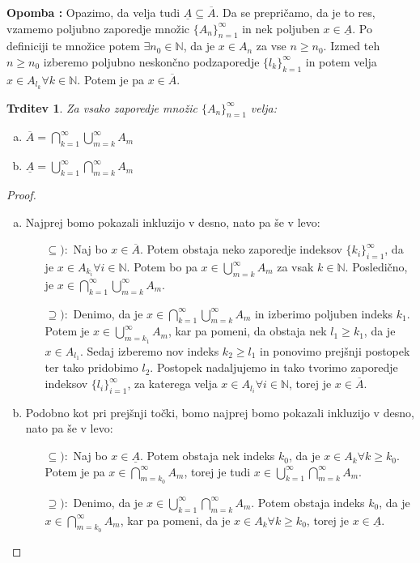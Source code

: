 \documentclass[a4paper, 10pt]{article}
\newtheorem{trditev}{Trditev}
\newcounter{opombe}
\newenvironment{opomba}{\begin{flushleft}\stepcounter{opombe}\textbf{Opomba \arabic{opombe}:}}{\hfill\end{flushleft}}
\newcommand{\mth}[1]{\ensuremath{\mathbb{#1}}}
\newcommand{\N}{\mth{N}}
\begin{document}
		\begin{opomba}
			Opazimo, da velja tudi $\underline{A} \subseteq \overline{A}$. Da se prepričamo, da je to res, vzamemo poljubno zaporedje množic $\{A_n\}_{n = 1}^\infty$ in nek poljuben $x\in \underline{A}$. Po definiciji te množice potem $\exists n_0\in\N$, da je $x\in A_n$ za vse $n\geq n_0$. Izmed teh $n\geq n_0$ izberemo poljubno neskončno podzaporedje $\{l_k\}_{k = 1}^\infty$ in potem velja $x\in A_{l_k} \forall k\in \N$. Potem je pa $x\in \overline{A}$.
		\end{opomba}
		\begin{trditev}
			\label{trd:karlimmn}
			Za vsako zaporedje množic $\{A_n\}_{n = 1}^\infty$ velja: \begin{enumerate}[a)]
				\item $\overline{A} = \bigcap_{k = 1}^\infty \bigcup_{m = k}^\infty A_m$
				\item $\underline{A} = \bigcup_{k = 1}^\infty \bigcap_{m = k}^\infty A_m$
			\end{enumerate}
		\end{trditev}
		\begin{proof}
			\begin{enumerate}[a)]
				\item Najprej bomo pokazali inkluzijo v desno, nato pa še v levo: \begin{itemize}
					\item[$\subseteq):$] Naj bo $x\in \overline{A}$. Potem obstaja neko zaporedje indeksov $\{k_i\}_{i = 1}^\infty$, da je $x\in A_{k_i} \forall i\in\N$. Potem bo pa $x\in \bigcup_{m = k}^\infty A_m$ za vsak $k\in\N$. Posledično, je $x\in \bigcap_{k = 1}^\infty \bigcup_{m = k}^\infty A_m$.
					\item[$\supseteq):$] Denimo, da je $x\in \bigcap_{k = 1}^\infty \bigcup_{m = k}^\infty A_m$ in izberimo poljuben indeks $k_1$. Potem je $x\in \bigcup_{m = k_1}^\infty A_m$, kar pa pomeni, da obstaja nek $l_1 \geq k_1$, da je $x\in A_{l_1}$. Sedaj izberemo nov indeks $k_2 \geq l_1$ in ponovimo prejšnji postopek ter tako pridobimo $l_2$. Postopek nadaljujemo in tako tvorimo zaporedje indeksov $\{l_i\}_{i =1}^\infty$, za katerega velja $x\in A_{l_i} \forall i\in\N$, torej je $x\in \overline{A}$.
				\end{itemize}
				\item Podobno kot pri prejšnji točki, bomo najprej bomo pokazali inkluzijo v desno, nato pa še v levo: \begin{itemize}
					\item[$\subseteq):$] Naj bo $x\in \underline{A}$. Potem obstaja nek indeks $k_0$, da je $x\in A_{k} \forall k \geq k_0$. Potem je pa $x\in \bigcap_{m = k_0}^\infty A_m$, torej je tudi $x\in \bigcup_{k = 1}^\infty \bigcap_{m = k}^\infty A_m$.
					\item[$\supseteq):$] Denimo, da je $x\in \bigcup_{k = 1}^\infty \bigcap_{m = k}^\infty A_m$. Potem obstaja indeks $k_0$, da je $x\in \bigcap_{m = k_0}^\infty A_m$, kar pa pomeni, da je $x\in A_{k} \forall k \geq k_0$, torej je $x\in \underline{A}$.
				\end{itemize}
			\end{enumerate}
		\end{proof}
		
\end{document}

